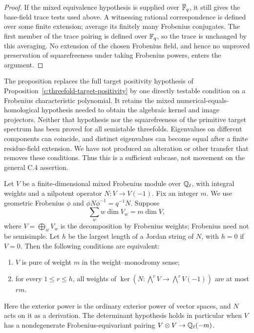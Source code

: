 \begin{proof}
If the mixed equivalence hypothesis is supplied over
$\overline{\mathbb F}_q$, it still gives the base-field trace tests used
above. A witnessing rational correspondence is defined over some
finite extension; average its finitely many Frobenius conjugates.
The first member of the trace pairing is defined over $\mathbb F_q$, so
the trace is unchanged by this averaging. No extension of the chosen
Frobenius field, and hence no unproved preservation of squarefreeness
under taking Frobenius powers, enters the argument.
\end{proof}

\begin{remark}
\label{c:threefold-simple-spectrum-scope}
The proposition replaces the full target positivity hypothesis of
Proposition~\ref{c:threefold-target-positivity} by one directly testable
condition on a Frobenius characteristic polynomial. It retains the
mixed numerical-equals-homological hypothesis needed to obtain the
algebraic kernel and image projectors. Neither that hypothesis nor the
squarefreeness of the primitive target spectrum has been proved for
all semistable threefolds. Eigenvalues on different components can
coincide, and distinct eigenvalues can become equal after a finite
residue-field extension. We have not produced an alteration or other
transfer that removes these conditions. Thus this is a sufficient
subcase, not movement on the general C.4 assertion.
\end{remark}


\begin{lemma}
\label{c:exterior-weight-criterion}
Let $V$ be a finite-dimensional mixed Frobenius module over
$\mathbb Q_\ell$, with integral weights and a nilpotent operator
$N:V\to V(-1)$.  Fix an integer $m$.  We use geometric Frobenius $\phi$ and
$\phi N\phi^{-1}=q^{-1}N$.  Suppose
\[
 \sum_w w\dim V_w=m\dim V,
\]
where $V=\bigoplus_wV_w$ is the decomposition by Frobenius
weights; Frobenius need not be semisimple.  Let $h$ be the
largest length of a Jordan string of $N$, with $h=0$ if $V=0$.
Then the following conditions are equivalent:
\begin{enumerate}
\item $V$ is pure of weight $m$ in the weight--monodromy sense;
\item for every $1\leq r\leq h$, all weights of
$\ker(N:\bigwedge^r V\to\bigwedge^r V(-1))$ are at most $rm$.
\end{enumerate}
Here the exterior power is the ordinary exterior power of vector
spaces, and $N$ acts on it as a derivation.  The determinant
hypothesis holds in particular when $V$ has a nondegenerate
Frobenius-equivariant pairing
$V\otimes V\to\mathbb Q_\ell(-m)$.
\end{lemma}

